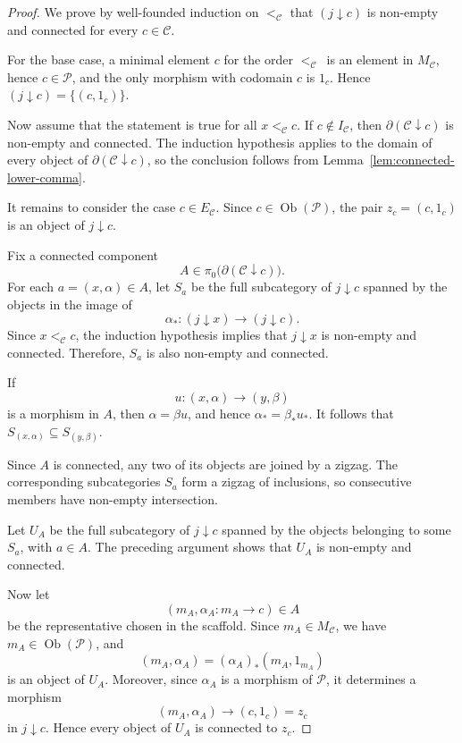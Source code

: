 \documentclass[12pt]{amsart}
\theoremstyle{definition}
\theoremstyle{remark}
\numberwithin{figure}{section}%
\newcommand{\CC}{\mathcal{C}}
\begin{document}
\begin{proof}
We prove by well-founded induction on \(<_\CC\) that
\((j\downarrow c)\) is non-empty and connected for every \(c\in\CC\).

For the base case, a minimal element \(c\) for the order \(<_\CC\)\ is an element in \(M_\CC\), hence \(c\in\mathcal P\), and the only morphism with
codomain \(c\) is \(1_c\). Hence
\(
(j\downarrow c)=\{(c,1_c)\}.
\)

Now assume that the statement is true for all \(x <_\CC c\). If \(c\notin I_\CC\), then \(\partial(\CC\downarrow c)\) is non-empty and connected. The
induction hypothesis applies to the domain of every object of
\(\partial(\CC\downarrow c)\), so the conclusion follows from
Lemma~\ref{lem:connected-lower-comma}.

It remains to consider the case \(c\in E_\CC\). Since
\(c\in\operatorname{Ob}(\mathcal P)\), the pair
\(
z_c=(c,1_c)
\)
is an object of \(j\downarrow c\).

Fix a connected component
\[
A\in\pi_0\bigl(\partial(\CC\downarrow c)\bigr).
\]
For each \(a=(x,\alpha)\in A\), let \(S_a\) be the full subcategory of
\(j\downarrow c\) spanned by the objects in the image of
\[
\alpha_*
\colon
(j\downarrow x)\longrightarrow(j\downarrow c).
\]
Since \(x<_\CC c\), the induction hypothesis implies that
\(j\downarrow x\) is non-empty and connected. Therefore, \(S_a\) is also
non-empty and connected.

If
\[
u\colon(x,\alpha)\longrightarrow(y,\beta)
\]
is a morphism in \(A\), then \(\alpha=\beta u\), and hence
\(
\alpha_*=\beta_*u_*.
\)
It follows that
\(
S_{(x,\alpha)}
\subseteq
S_{(y,\beta)}.
\)

Since \(A\) is connected, any two of its objects are joined by a zigzag.
The corresponding subcategories \(S_a\) form a zigzag of inclusions, so
consecutive members have non-empty intersection.

Let \(U_A\) be the full subcategory of \(j\downarrow c\) spanned by the
objects belonging to some \(S_a\), with \(a\in A\). The preceding
argument shows that \(U_A\) is non-empty and connected.

Now let
\[
(m_A,\alpha_A\colon m_A\to c)\in A
\]
be the representative chosen in the scaffold. Since \(m_A\in M_\CC\),
we have \(m_A\in\operatorname{Ob}(\mathcal P)\), and
\[
(m_A,\alpha_A)
=
(\alpha_A)_*(m_A,1_{m_A})
\]
is an object of \(U_A\). Moreover, since \(\alpha_A\) is a morphism of
\(\mathcal P\), it determines a morphism
\[
(m_A,\alpha_A)\longrightarrow(c,1_c)=z_c
\]
in \(j\downarrow c\). Hence every object of \(U_A\) is connected to
\(z_c\).


\end{proof}
\end{document}
